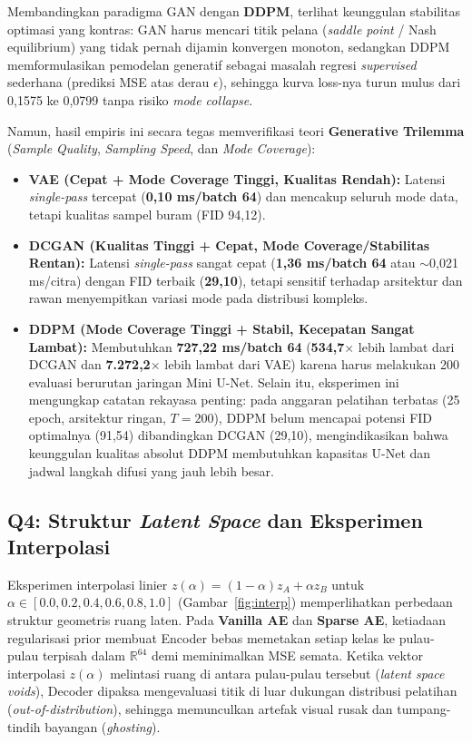 \documentclass[11pt,a4paper]{article}
\begin{document}
Membandingkan paradigma GAN dengan \textbf{DDPM}, terlihat keunggulan stabilitas optimasi yang kontras: GAN harus mencari titik pelana (\textit{saddle point} / Nash equilibrium) yang tidak pernah dijamin konvergen monoton, sedangkan DDPM memformulasikan pemodelan generatif sebagai masalah regresi \textit{supervised} sederhana (prediksi MSE atas derau $\epsilon$), sehingga kurva loss-nya turun mulus dari 0,1575 ke 0,0799 tanpa risiko \textit{mode collapse}.

Namun, hasil empiris ini secara tegas memverifikasi teori \textbf{Generative Trilemma} (\textit{Sample Quality}, \textit{Sampling Speed}, dan \textit{Mode Coverage}):
\begin{itemize}[leftmargin=1.4em, itemsep=2pt]
  \item \textbf{VAE (Cepat + Mode Coverage Tinggi, Kualitas Rendah):} Latensi \textit{single-pass} tercepat (\textbf{0,10 ms/batch 64}) dan mencakup seluruh mode data, tetapi kualitas sampel buram (FID 94,12).
  \item \textbf{DCGAN (Kualitas Tinggi + Cepat, Mode Coverage/Stabilitas Rentan):} Latensi \textit{single-pass} sangat cepat (\textbf{1,36 ms/batch 64} atau $\sim$0,021 ms/citra) dengan FID terbaik (\textbf{29,10}), tetapi sensitif terhadap arsitektur dan rawan menyempitkan variasi mode pada distribusi kompleks.
  \item \textbf{DDPM (Mode Coverage Tinggi + Stabil, Kecepatan Sangat Lambat):} Membutuhkan \textbf{727,22 ms/batch 64} (\textbf{534,7$\times$} lebih lambat dari DCGAN dan \textbf{7.272,2$\times$} lebih lambat dari VAE) karena harus melakukan 200 evaluasi berurutan jaringan Mini U-Net. Selain itu, eksperimen ini mengungkap catatan rekayasa penting: pada anggaran pelatihan terbatas (25 epoch, arsitektur ringan, $T=200$), DDPM belum mencapai potensi FID optimalnya (91,54) dibandingkan DCGAN (29,10), mengindikasikan bahwa keunggulan kualitas absolut DDPM membutuhkan kapasitas U-Net dan jadwal langkah difusi yang jauh lebih besar.
\end{itemize}

\subsection{Q4: Struktur \textit{Latent Space} dan Eksperimen Interpolasi}
Eksperimen interpolasi linier $z(\alpha) = (1-\alpha)z_A + \alpha z_B$ untuk $\alpha \in [0.0, 0.2, 0.4, 0.6, 0.8, 1.0]$ (Gambar~\ref{fig:interp}) memperlihatkan perbedaan struktur geometris ruang laten. Pada \textbf{Vanilla AE} dan \textbf{Sparse AE}, ketiadaan regularisasi prior membuat Encoder bebas memetakan setiap kelas ke pulau-pulau terpisah dalam $\mathbb{R}^{64}$ demi meminimalkan MSE semata. Ketika vektor interpolasi $z(\alpha)$ melintasi ruang di antara pulau-pulau tersebut (\textit{latent space voids}), Decoder dipaksa mengevaluasi titik di luar dukungan distribusi pelatihan (\textit{out-of-distribution}), sehingga memunculkan artefak visual rusak dan tumpang-tindih bayangan (\textit{ghosting}).
\end{document}
